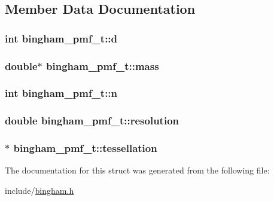 \subsection{Member Data Documentation}
\hypertarget{structbingham__pmf__t_abfb8eb53f34efe0ea621950f50b3693f}{
\subsubsection[{d}]{\setlength{\rightskip}{0pt plus 5cm}int {\bf bingham\_\-pmf\_\-t::d}}}
\label{structbingham__pmf__t_abfb8eb53f34efe0ea621950f50b3693f}
\hypertarget{structbingham__pmf__t_aa17510093229608bd1501c7301bc3a7b}{
\subsubsection[{mass}]{\setlength{\rightskip}{0pt plus 5cm}double$\ast$ {\bf bingham\_\-pmf\_\-t::mass}}}
\label{structbingham__pmf__t_aa17510093229608bd1501c7301bc3a7b}
\hypertarget{structbingham__pmf__t_af5f44df5873fadd61d52d13cae35995b}{
\subsubsection[{n}]{\setlength{\rightskip}{0pt plus 5cm}int {\bf bingham\_\-pmf\_\-t::n}}}
\label{structbingham__pmf__t_af5f44df5873fadd61d52d13cae35995b}
\hypertarget{structbingham__pmf__t_a28f08b376b3092df65d426d24c69f403}{
\subsubsection[{resolution}]{\setlength{\rightskip}{0pt plus 5cm}double {\bf bingham\_\-pmf\_\-t::resolution}}}
\label{structbingham__pmf__t_a28f08b376b3092df65d426d24c69f403}
\hypertarget{structbingham__pmf__t_a8365a339f36891609a3595d4d25fbbc1}{
\subsubsection[{tessellation}]{$\ast$ {\bf bingham\_\-pmf\_\-t::tessellation}}}
\label{structbingham__pmf__t_a8365a339f36891609a3595d4d25fbbc1}


The documentation for this struct was generated from the following file:\begin{DoxyCompactItemize}
\item 
include/\hyperlink{bingham_8h}{bingham.h}\end{DoxyCompactItemize}
